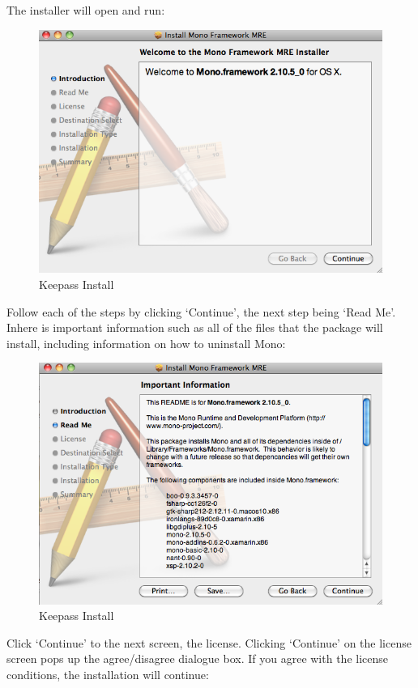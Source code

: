 The installer will open and run:

\begin{figure}[htbp]
\centering
\includegraphics{keepass_12.png}
\caption{Keepass Install}
\end{figure}

Follow each of the steps by clicking `Continue', the next step being
`Read Me'. Inhere is important information such as all of the files that
the package will install, including information on how to uninstall
Mono:

\begin{figure}[htbp]
\centering
\includegraphics{keepass_13.png}
\caption{Keepass Install}
\end{figure}

Click `Continue' to the next screen, the license. Clicking `Continue' on
the license screen pops up the agree/disagree dialogue box. If you agree
with the license conditions, the installation will continue:

